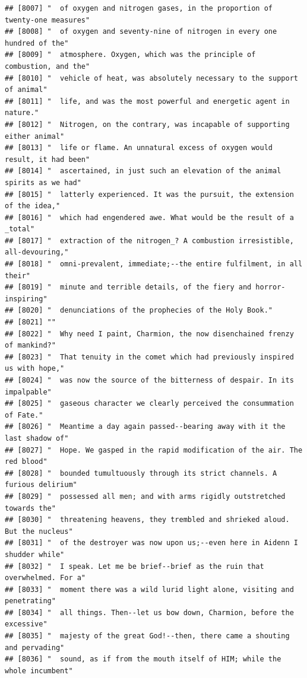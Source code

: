 \documentclass{article}\usepackage[]{graphicx}\usepackage[]{color}
\makeatletter
\newenvironment{kframe}{%
 \def\at@end@of@kframe{}%
 \ifinner\ifhmode%
  \def\at@end@of@kframe{\end{minipage}}%
  \begin{minipage}{\columnwidth}%
 \fi\fi%
 \def\FrameCommand##1{\hskip\@totalleftmargin \hskip-\fboxsep
 \colorbox{shadecolor}{##1}\hskip-\fboxsep
     \hskip-\linewidth \hskip-\@totalleftmargin \hskip\columnwidth}%
 \MakeFramed {\advance\hsize-\width
   \@totalleftmargin\z@ \linewidth\hsize
   \@setminipage}}%
 {\par\unskip\endMakeFramed%
 \at@end@of@kframe}
\newenvironment{knitrout}{}{} %
\makeatother
\begin{document}
\begin{knitrout}
\begin{kframe}
\begin{verbatim}
## [8007] "  of oxygen and nitrogen gases, in the proportion of twenty-one measures"    
## [8008] "  of oxygen and seventy-nine of nitrogen in every one hundred of the"        
## [8009] "  atmosphere. Oxygen, which was the principle of combustion, and the"        
## [8010] "  vehicle of heat, was absolutely necessary to the support of animal"        
## [8011] "  life, and was the most powerful and energetic agent in nature."            
## [8012] "  Nitrogen, on the contrary, was incapable of supporting either animal"      
## [8013] "  life or flame. An unnatural excess of oxygen would result, it had been"    
## [8014] "  ascertained, in just such an elevation of the animal spirits as we had"    
## [8015] "  latterly experienced. It was the pursuit, the extension of the idea,"      
## [8016] "  which had engendered awe. What would be the result of a _total"            
## [8017] "  extraction of the nitrogen_? A combustion irresistible, all-devouring,"    
## [8018] "  omni-prevalent, immediate;--the entire fulfilment, in all their"           
## [8019] "  minute and terrible details, of the fiery and horror-inspiring"            
## [8020] "  denunciations of the prophecies of the Holy Book."                         
## [8021] ""                                                                            
## [8022] "  Why need I paint, Charmion, the now disenchained frenzy of mankind?"       
## [8023] "  That tenuity in the comet which had previously inspired us with hope,"     
## [8024] "  was now the source of the bitterness of despair. In its impalpable"        
## [8025] "  gaseous character we clearly perceived the consummation of Fate."          
## [8026] "  Meantime a day again passed--bearing away with it the last shadow of"      
## [8027] "  Hope. We gasped in the rapid modification of the air. The red blood"       
## [8028] "  bounded tumultuously through its strict channels. A furious delirium"      
## [8029] "  possessed all men; and with arms rigidly outstretched towards the"         
## [8030] "  threatening heavens, they trembled and shrieked aloud. But the nucleus"    
## [8031] "  of the destroyer was now upon us;--even here in Aidenn I shudder while"    
## [8032] "  I speak. Let me be brief--brief as the ruin that overwhelmed. For a"       
## [8033] "  moment there was a wild lurid light alone, visiting and penetrating"       
## [8034] "  all things. Then--let us bow down, Charmion, before the excessive"         
## [8035] "  majesty of the great God!--then, there came a shouting and pervading"      
## [8036] "  sound, as if from the mouth itself of HIM; while the whole incumbent"      

\end{verbatim}
\end{kframe}
\end{knitrout}
\end{document}
